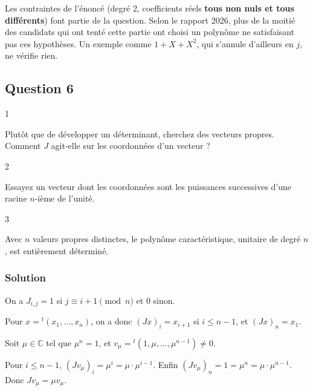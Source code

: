 \documentclass[11pt,a4paper]{article}
\begin{document}
\begin{piege}

Les contraintes de l'énoncé (degré 2, coefficients réels \textbf{tous non nuls et tous différents}) font partie de la question. Selon le rapport 2026, plus de la moitié des candidats qui ont tenté cette partie ont choisi un polynôme ne satisfaisant pas ces hypothèses. Un exemple comme \(1+X+X^2\), qui s'annule d'ailleurs en \(j\), ne vérifie rien.

\end{piege}

\hypertarget{question-6}{%
\subsection{Question 6}\label{question-6}}

\begin{indication}{1}

Plutôt que de développer un déterminant, cherchez des vecteurs propres. Comment \(J\) agit-elle sur les coordonnées d'un vecteur ?

\end{indication}

\begin{indication}{2}

Essayez un vecteur dont les coordonnées sont les puissances successives d'une racine \(n\)-ième de l'unité.

\end{indication}

\begin{indication}{3}

Avec \(n\) valeurs propres distinctes, le polynôme caractéristique, unitaire de degré \(n\), est entièrement déterminé.

\end{indication}

\hypertarget{solution-5}{%
\subsubsection{Solution}\label{solution-5}}

On a \(J_{i,j}=1\) si \(j\equiv i+1\pmod n\) et \(0\) sinon.

Pour \(x={}^t(x_1,\dots,x_n)\), on a donc \((Jx)_i=x_{i+1}\) si \(i\le n-1\), et \((Jx)_n=x_1\).

Soit \(\mu\in\mathbb C\) tel que \(\mu^n=1\), et \(v_\mu={}^t(1,\mu,\dots,\mu^{n-1})\neq0\).

Pour \(i\le n-1\), \((Jv_\mu)_i=\mu^i=\mu\cdot\mu^{i-1}\). Enfin \((Jv_\mu)_n=1=\mu^n=\mu\cdot\mu^{n-1}\). Donc \(Jv_\mu=\mu v_\mu\).
\end{document}
